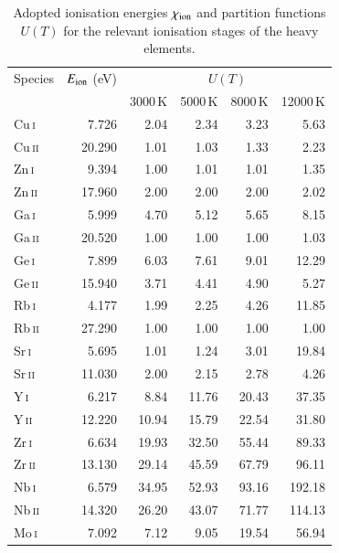 \documentclass[traditabstract]{aa}
\newcommand{\altcui}{Cu\,\textsc{i}}
\newcommand{\altcuii}{Cu\,\textsc{ii}}
\newcommand{\altzni}{Zn\,\textsc{i}}
\newcommand{\altznii}{Zn\,\textsc{ii}}
\newcommand{\altgai}{Ga\,\textsc{i}}
\newcommand{\altgaii}{Ga\,\textsc{ii}}
\newcommand{\altgei}{Ge\,\textsc{i}}
\newcommand{\altgeii}{Ge\,\textsc{ii}}
\newcommand{\altrbi}{Rb\,\textsc{i}}
\newcommand{\altrbii}{Rb\,\textsc{ii}}
\newcommand{\altsri}{Sr\,\textsc{i}}
\newcommand{\altsrii}{Sr\,\textsc{ii}}
\newcommand{\altyi}{Y\,\textsc{i}}
\newcommand{\altyii}{Y\,\textsc{ii}}
\newcommand{\altzri}{Zr\,\textsc{i}}
\newcommand{\altzrii}{Zr\,\textsc{ii}}
\newcommand{\altnbi}{Nb\,\textsc{i}}
\newcommand{\altnbii}{Nb\,\textsc{ii}}
\newcommand{\altmoi}{Mo\,\textsc{i}}
\newcommand{\cui}{\altcui\ }
\newcommand{\cuii}{\altcuii\ }
\newcommand{\zni}{\altzni\ }
\newcommand{\znii}{\altznii\ }
\newcommand{\gai}{\altgai\ }
\newcommand{\gaii}{\altgaii\ }
\newcommand{\gei}{\altgei\ }
\newcommand{\geii}{\altgeii\ }
\newcommand{\rbi}{\altrbi\ }
\newcommand{\rbii}{\altrbii\ }
\newcommand{\sri}{\altsri\ }
\newcommand{\srii}{\altsrii\ }
\newcommand{\yi}{\altyi\ }
\newcommand{\yii}{\altyii\ }
\newcommand{\zri}{\altzri\ }
\newcommand{\zrii}{\altzrii\ }
\newcommand{\nbi}{\altnbi\ }
\newcommand{\nbii}{\altnbii\ }
\newcommand{\moi}{\altmoi\ }
\begin{document}
\twocolumn
\begin{table}
\caption{Adopted ionisation energies $\chi_{\rm ion}$ and partition functions $U(T)$ 
for the relevant ionisation stages of the heavy elements.}
\label{table:partition} 
\begin{minipage}{\columnwidth}
\centering
\begin{tabular}{l r r r r r}
\hline
\hline Species & $E_{\rm ion}$ (eV) &  \multicolumn{4}{c}{$U(T)$} \\
               &                    & 3000\,K & 5000\,K & 8000\,K & 12000\,K \\
\hline
  \cui  &   7.726 &      2.04 &      2.34 &      3.23 &      5.63 \\
  \cuii &  20.290 &      1.01 &      1.03 &      1.33 &      2.23 \\
  \zni  &   9.394 &      1.00 &      1.01 &      1.01 &      1.35 \\
  \znii &  17.960 &      2.00 &      2.00 &      2.00 &      2.02 \\
  \gai  &   5.999 &      4.70 &      5.12 &      5.65 &      8.15 \\
  \gaii &  20.520 &      1.00 &      1.00 &      1.00 &      1.03 \\
  \gei  &   7.899 &      6.03 &      7.61 &      9.01 &     12.29 \\
  \geii &  15.940 &      3.71 &      4.41 &      4.90 &      5.27 \\
  \rbi  &   4.177 &      1.99 &      2.25 &      4.26 &     11.85 \\
  \rbii &  27.290 &      1.00 &      1.00 &      1.00 &      1.00 \\
  \sri  &   5.695 &      1.01 &      1.24 &      3.01 &     19.84 \\
  \srii &  11.030 &      2.00 &      2.15 &      2.78 &      4.26 \\
  \yi   &   6.217 &      8.84 &     11.76 &     20.43 &     37.35 \\
  \yii  &  12.220 &     10.94 &     15.79 &     22.54 &     31.80 \\
  \zri  &   6.634 &     19.93 &     32.50 &     55.44 &     89.33 \\
  \zrii &  13.130 &     29.14 &     45.59 &     67.79 &     96.11 \\
  \nbi  &   6.579 &     34.95 &     52.93 &     93.16 &    192.18 \\
  \nbii &  14.320 &     26.20 &     43.07 &     71.77 &    114.13 \\
  \moi  &   7.092 &      7.12 &      9.05 &     19.54 &     56.94 \\

\end{tabular}
\end{minipage}
\end{table}
\end{document}
